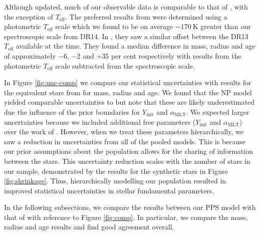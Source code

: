 \documentclass[a4paper,fleqn,usenatbib]{mnras}
\newcommand{\teff}{\ensuremath{T_\mathrm{eff}}}
\newcommand{\mlt}{\ensuremath{{\alpha_\mathrm{MLT}}}}
\begin{document}
Although updated, much of our observable data is comparable to that of , with the exception of $\teff$. The preferred results from  were determined using a photometric $\teff$ scale which we found to be on average $\sim \SI{170}{\kelvin}$ greater than our spectroscopic scale from DR14. In , they saw a similar offset between the DR13 $\teff$ available at the time. They found a median difference in mass, radius and age of approximately $-6$, $-2$ and $+35$ per cent respectively with results from the photometric $\teff$ scale subtracted from the spectroscopic scale.

In Figure \ref{fig:unc-comp} we compare our statistical uncertainties with results for the equivalent stars from  for mass, radius and age. We found that the NP model yielded comparable uncertainties to  but note that these are likely underestimated due the influence of the prior boundaries for $Y_\mathrm{init}$ and $\mlt$. We expected larger uncertainties because we included additional free parameters ($Y_\mathrm{init}$ and $\mlt$) over the work of . However, when we treat these parameters hierarchically, we saw a reduction in uncertainties from all of the pooled models. This is because our prior assumptions about the population allows for the sharing of information between the stars. This uncertainty reduction scales with the number of stars in our sample, demonstrated by the results for the synthetic stars in Figure \ref{fig:shrinkage}. Thus, hierarchically modelling our population resulted in improved statistical uncertainties in stellar fundamental parameters.

In the following subsections, we compare the results between our PPS model with that of  with reference to Figure \ref{fig:comp}. In particular, we compare the mass, radius and age results and find good agreement overall.
\end{document}
